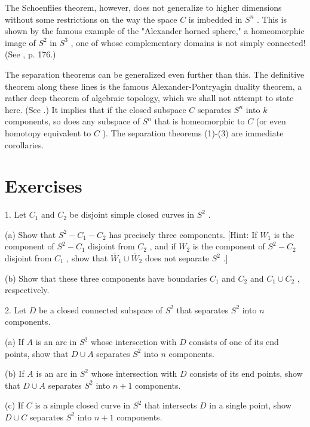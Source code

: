 The Schoenflies theorem, however, does not generalize to higher dimensions without some restrictions on the way the space \(C\) is imbedded in \({S}^{n}\) . This is shown by the famous example of the "Alexander horned sphere," a homeomorphic image of \({S}^{2}\) in \({S}^{3}\) , one of whose complementary domains is not simply connected! (See 		\cite{HockingYoung1961}, p. 176.)

The separation theorems can be generalized even further than this. The definitive theorem along these lines is the famous Alexander-Pontryagin duality theorem, a rather deep theorem of algebraic topology, which we shall not attempt to state here. (See 		\cite{Munkres1993}.) It implies that if the closed subspace \(C\) separates \({S}^{n}\) into \(k\) components, so does any subspace of \({S}^{n}\) that is homeomorphic to \(C\) (or even homotopy equivalent to \(C\) ). The separation theorems (1)-(3) are immediate corollaries.

\section*{Exercises}

1. Let \({C}_{1}\) and \({C}_{2}\) be disjoint simple closed curves in \({S}^{2}\) .

(a) Show that \({S}^{2} - {C}_{1} - {C}_{2}\) has precisely three components. [Hint: If \({W}_{1}\) is the component of \({S}^{2} - {C}_{1}\) disjoint from \({C}_{2}\) , and if \({W}_{2}\) is the component of \({S}^{2} - {C}_{2}\) disjoint from \({C}_{1}\) , show that \({\bar{W}}_{1} \cup  {\bar{W}}_{2}\) does not separate \({S}^{2}\) .]

(b) Show that these three components have boundaries \({C}_{1}\) and \({C}_{2}\) and \({C}_{1} \cup  {C}_{2}\) , respectively.

2. Let \(D\) be a closed connected subspace of \({S}^{2}\) that separates \({S}^{2}\) into \(n\) components.

(a) If \(A\) is an arc in \({S}^{2}\) whose intersection with \(D\) consists of one of its end points, show that \(D \cup  A\) separates \({S}^{2}\) into \(n\) components.

(b) If \(A\) is an arc in \({S}^{2}\) whose intersection with \(D\) consists of its end points, show that \(D \cup  A\) separates \({S}^{2}\) into \(n + 1\) components.

(c) If \(C\) is a simple closed curve in \({S}^{2}\) that intersects \(D\) in a single point, show \(D \cup  C\) separates \({S}^{2}\) into \(n + 1\) components.

